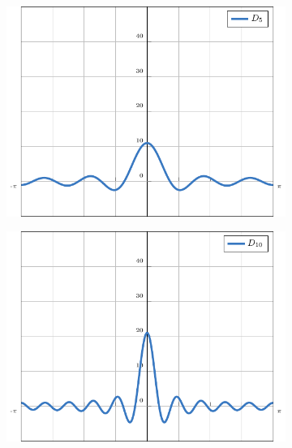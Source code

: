 \documentclass{beamer}
\begin{document}
\begin{frame}
    \begin{figure}[H]
    \centering
    \begin{subfigure}[b]{0.49\textwidth}
        \centering
        \includegraphics[scale = 0.49]{plot1/main.pdf}
    \end{subfigure}
    \begin{subfigure}[b]{0.49\textwidth}
        \centering
        \includegraphics[scale = 0.49]{plot2/main.pdf}
    \end{subfigure}
    \par\bigskip
    \begin{subfigure}[b]{0.49\textwidth}
        \centering

\end{subfigure}
\end{figure}
\end{frame}
\end{document}
